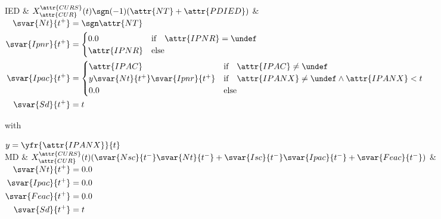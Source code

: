 	\hline
	IED & $X_{\attr{CUR}}^{\attr{CURS}}(t)\sgn(-1)(\attr{NT}+\attr{PDIED})$
		& {$\begin{aligned}
			\svar{Nt}{t^+} &=\sgn\attr{NT} \\
			\svar{Ipnr}{t^+} &= \begin{cases} 0.0 & \text{if} \quad \attr{IPNR}=\undef \\
							\attr{IPNR} & \text{else} \end{cases} \\
			\svar{Ipac}{t^+} &= \begin{cases} \attr{IPAC} & \text{if} \quad \attr{IPAC} \neq \undef \\
							y\svar{Nt}{t^+}\svar{Ipnr}{t^+} & \text{if} \quad \attr{IPANX} \neq \undef \land \attr{IPANX}<t \\
							0.0 & \text{else} \end{cases} \\
			\svar{Sd}{t^+} &= t \end{aligned}$}\par
		with\par
		$y=\yfr{\attr{IPANX}}{t}$ \\
	\hline
	MD & $X_{\attr{CUR}}^{\attr{CURS}}(t)(\svar{Nsc}{t^-}\svar{Nt}{t^-}+\svar{Isc}{t^-}\svar{Ipac}{t^-}+\svar{Feac}{t^-})$
		& {$\begin{aligned}
			\svar{Nt}{t^+} &= 0.0 \\
			\svar{Ipac}{t^+} &= 0.0 \\
			\svar{Feac}{t^+} &= 0.0 \\
			\svar{Sd}{t^+} &= t \end{aligned}$} \\
	\hline
